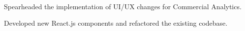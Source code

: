 \documentclass[]{deedy-resume-openfont}
\begin{document}
\begin{minipage}[t]{0.66\textwidth}
\vspace{\topsep} %
\begin{tightemize}
\item Spearheaded the implementation of UI/UX changes for Commercial Analytics.
\item Developed new React.js components and refactored the existing codebase.
\end{tightemize}
\sectionsep







\end{minipage}
\end{document}
